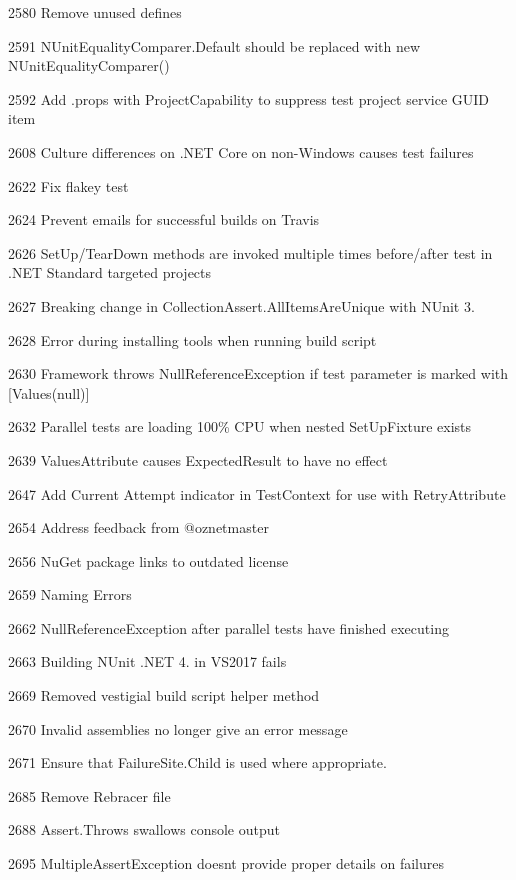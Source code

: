 \begin{DoxyItemize}
\item 2580 Remove unused defines
\item 2591 N\+Unit\+Equality\+Comparer.\+Default should be replaced with new N\+Unit\+Equality\+Comparer()
\item 2592 Add .props with Project\+Capability to suppress test project service G\+U\+ID item
\item 2608 Culture differences on .N\+ET Core on non-\/\+Windows causes test failures
\item 2622 Fix flakey test
\item 2624 Prevent emails for successful builds on Travis
\item 2626 Set\+Up/\+Tear\+Down methods are invoked multiple times before/after test in .N\+ET Standard targeted projects
\item 2627 Breaking change in Collection\+Assert.\+All\+Items\+Are\+Unique with N\+Unit 3.
\item 2628 Error during installing tools when running build script
\item 2630 Framework throws Null\+Reference\+Exception if test parameter is marked with \mbox{[}Values(null)\mbox{]}
\item 2632 Parallel tests are loading 100\% C\+PU when nested Set\+Up\+Fixture exists
\item 2639 Values\+Attribute causes Expected\+Result to have no effect
\item 2647 Add Current Attempt indicator in Test\+Context for use with Retry\+Attribute
\item 2654 Address feedback from @oznetmaster
\item 2656 Nu\+Get package links to outdated license
\item 2659 Naming Errors
\item 2662 Null\+Reference\+Exception after parallel tests have finished executing
\item 2663 Building N\+Unit .N\+ET 4. in V\+S2017 fails
\item 2669 Removed vestigial build script helper method
\item 2670 Invalid assemblies no longer give an error message
\item 2671 Ensure that Failure\+Site.\+Child is used where appropriate.
\item 2685 Remove Rebracer file
\item 2688 Assert.\+Throws swallows console output
\item 2695 Multiple\+Assert\+Exception doesn\textquotesingle{}t provide proper details on failures

\end{DoxyItemize}
